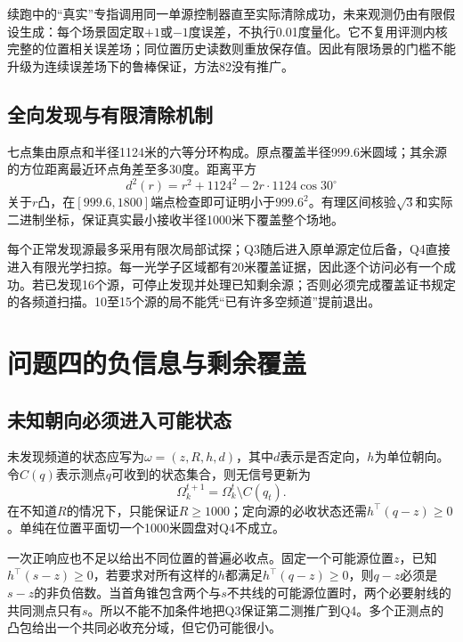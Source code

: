 \documentclass[UTF8,a4paper,zihao=-4,fontset=mac]{ctexart}
\begin{document}
续跑中的“真实”专指调用同一单源控制器直至实际清除成功，未来观测仍由有限假设生成：每个场景固定取$+1$或$-1$度误差，不执行0.01度量化。它不复用评测内核完整的位置相关误差场；同位置历史读数则重放保存值。因此有限场景的门槛不能升级为连续误差场下的鲁棒保证，方法82没有推广。

\subsection{全向发现与有限清除机制}
七点集由原点和半径1124米的六等分环构成。原点覆盖半径999.6米圆域；其余源的方位距离最近环点角差至多30度。距离平方
\begin{equation}d^2(r)=r^2+1124^2-2r\cdot1124\cos30^\circ\end{equation}
关于$r$凸，在$[999.6,1800]$端点检查即可证明小于$999.6^2$。有理区间核验$\sqrt3$和实际二进制坐标，保证真实最小接收半径1000米下覆盖整个场地。

每个正常发现源最多采用有限次局部试探；Q3随后进入原单源定位后备，Q4直接进入有限光学扫掠。每一光学子区域都有20米覆盖证据，因此逐个访问必有一个成功。若已发现16个源，可停止发现并处理已知剩余源；否则必须完成覆盖证书规定的各频道扫描。10至15个源的局不能凭“已有许多空频道”提前退出。

\section{问题四的负信息与剩余覆盖}
\subsection{未知朝向必须进入可能状态}
未发现频道的状态应写为$\omega=(z,R,h,d)$，其中$d$表示是否定向，$h$为单位朝向。令$C(q)$表示测点$q$可收到的状态集合，则无信号更新为
\begin{equation}\Omega_k^{t+1}=\Omega_k^t\setminus C(q_t).\end{equation}
在不知道$R$的情况下，只能保证$R\ge1000$；定向源的必收状态还需$h^\top(q-z)\ge0$。单纯在位置平面切一个1000米圆盘对Q4不成立。

一次正响应也不足以给出不同位置的普遍必收点。固定一个可能源位置$z$，已知$h^\top(s-z)\ge0$，若要求对所有这样的$h$都满足$h^\top(q-z)\ge0$，则$q-z$必须是$s-z$的非负倍数。当首角锥包含两个与$s$不共线的可能源位置时，两个必要射线的共同测点只有$s$。所以不能不加条件地把Q3保证第二测推广到Q4。多个正测点的凸包给出一个共同必收充分域，但它仍可能很小。
\end{document}
